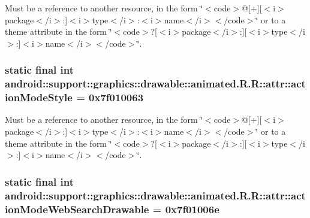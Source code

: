 Must be a reference to another resource, in the form \char`\"{}$<$code$>$@\mbox{[}+\mbox{]}\mbox{[}$<$i$>$package$<$/i$>$:\mbox{]}$<$i$>$type$<$/i$>$:$<$i$>$name$<$/i$>$$<$/code$>$\char`\"{} or to a theme attribute in the form \char`\"{}$<$code$>$?\mbox{[}$<$i$>$package$<$/i$>$:\mbox{]}\mbox{[}$<$i$>$type$<$/i$>$:\mbox{]}$<$i$>$name$<$/i$>$$<$/code$>$\char`\"{}. \hypertarget{classandroid_1_1support_1_1graphics_1_1drawable_1_1animated_1_1_r_1_1attr_4fb55d4a0d9302d15ef95773abbe9449}{
\subsubsection[{actionModeStyle}]{\setlength{\rightskip}{0pt plus 5cm}static final int android::support::graphics::drawable::animated.R.R::attr::actionModeStyle = 0x7f010063}}
\label{classandroid_1_1support_1_1graphics_1_1drawable_1_1animated_1_1_r_1_1attr_4fb55d4a0d9302d15ef95773abbe9449}


Must be a reference to another resource, in the form \char`\"{}$<$code$>$@\mbox{[}+\mbox{]}\mbox{[}$<$i$>$package$<$/i$>$:\mbox{]}$<$i$>$type$<$/i$>$:$<$i$>$name$<$/i$>$$<$/code$>$\char`\"{} or to a theme attribute in the form \char`\"{}$<$code$>$?\mbox{[}$<$i$>$package$<$/i$>$:\mbox{]}\mbox{[}$<$i$>$type$<$/i$>$:\mbox{]}$<$i$>$name$<$/i$>$$<$/code$>$\char`\"{}. \hypertarget{classandroid_1_1support_1_1graphics_1_1drawable_1_1animated_1_1_r_1_1attr_816294569ae7a798d00f22ca9634adb8}{
\subsubsection[{actionModeWebSearchDrawable}]{\setlength{\rightskip}{0pt plus 5cm}static final int android::support::graphics::drawable::animated.R.R::attr::actionModeWebSearchDrawable = 0x7f01006e}}
\label{classandroid_1_1support_1_1graphics_1_1drawable_1_1animated_1_1_r_1_1attr_816294569ae7a798d00f22ca9634adb8}


